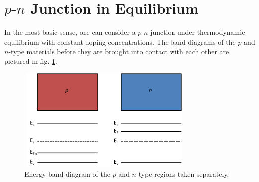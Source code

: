 \section{$p$-$n$ Junction in Equilibrium}\label{sec:sec002}
In the most basic sense, one can consider a $p$-$n$ junction under thermodynamic equilibrium with 
constant doping concentrations. The band diagrams of the $p$ and $n$-type materials before they are brought
into contact with each other are pictured in  fig. \ref{fig:fig01}. 

\begin{figure}[h!]\label{fig:fig01}
    \centering
    \includegraphics[height=5cm,width=8.5cm]{figs/unbiased_pn_junction_bands}
    \caption{Energy band diagram of the $p$ and $n$-type regions taken separately.}
\end{figure}

